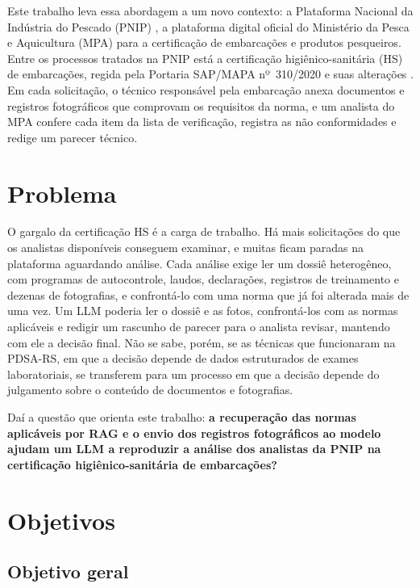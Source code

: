 Este trabalho leva essa abordagem a um novo contexto: a Plataforma Nacional da Indústria do Pescado (PNIP) \cite{MPA2024}, a plataforma digital oficial do Ministério da Pesca e Aquicultura (MPA) para a certificação de embarcações e produtos pesqueiros. Entre os processos tratados na PNIP está a certificação higiênico-sanitária (HS) de embarcações, regida pela Portaria SAP/MAPA nº~310/2020 e suas alterações \cite{Portaria310,Portaria171,Portaria742}. Em cada solicitação, o técnico responsável pela embarcação anexa documentos e registros fotográficos que comprovam os requisitos da norma, e um analista do MPA confere cada item da lista de verificação, registra as não conformidades e redige um parecer técnico.

\section{Problema}
\label{sec:problema}

O gargalo da certificação HS é a carga de trabalho. Há mais solicitações do que os analistas disponíveis conseguem examinar, e muitas ficam paradas na plataforma aguardando análise. Cada análise exige ler um dossiê heterogêneo, com programas de autocontrole, laudos, declarações, registros de treinamento e dezenas de fotografias, e confrontá-lo com uma norma que já foi alterada mais de uma vez. Um LLM poderia ler o dossiê e as fotos, confrontá-los com as normas aplicáveis e redigir um rascunho de parecer para o analista revisar, mantendo com ele a decisão final. Não se sabe, porém, se as técnicas que funcionaram na PDSA-RS, em que a decisão depende de dados estruturados de exames laboratoriais, se transferem para um processo em que a decisão depende do julgamento sobre o conteúdo de documentos e fotografias.

Daí a questão que orienta este trabalho: \textbf{a recuperação das normas aplicáveis por RAG e o envio dos registros fotográficos ao modelo ajudam um LLM a reproduzir a análise dos analistas da PNIP na certificação higiênico-sanitária de embarcações?}

\section{Objetivos}
\label{sec:objetivos}

\subsection{Objetivo geral}

